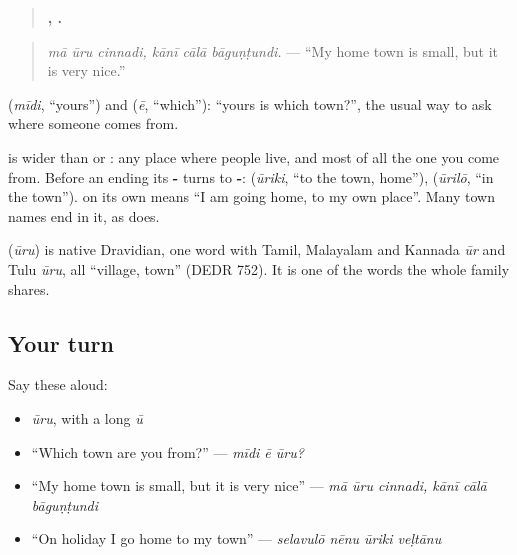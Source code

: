 \begin{quote}
\textbf{  ,   .}
\end{quote}

\begin{quote}
\emph{mā ūru cinnadi, kānī cālā bāguṇṭundi.} — \textquotedblleft{}My home town is small, but it is very nice.\textquotedblright{}
\end{quote}

\textbf{} (\emph{mīdi}, \textquotedblleft{}yours\textquotedblright{}) and \textbf{} (\emph{ē}, \textquotedblleft{}which\textquotedblright{}): \textquotedblleft{}yours is which town?\textquotedblright{}, the usual way to ask where someone comes from.

\textbf{} is wider than \textbf{} or \textbf{}: any place where people live, and most of all the one you come from. Before an ending its \textbf{-} turns to \textbf{-}: \textbf{} (\emph{ūriki}, \textquotedblleft{}to the town, home\textquotedblright{}), \textbf{} (\emph{ūrilō}, \textquotedblleft{}in the town\textquotedblright{}). \textbf{ } on its own means \textquotedblleft{}I am going home, to my own place\textquotedblright{}. Many town names end in it, as \textbf{} does.

\begin{cousinweb}
\textbf{} (\emph{ūru}) is native Dravidian, one word with Tamil, Malayalam and Kannada \emph{ūr} and Tulu \emph{ūru}, all \textquotedblleft{}village, town\textquotedblright{} (DEDR 752). It is one of the words the whole family shares.
\end{cousinweb}

\subsection*{Your turn}
Say these aloud:

\begin{itemize}
\raggedright
  \item \emph{ūru}, with a long \emph{ū}
  \item \textquotedblleft{}Which town are you from?\textquotedblright{} — \emph{mīdi ē ūru?}
  \item \textquotedblleft{}My home town is small, but it is very nice\textquotedblright{} — \emph{mā ūru cinnadi, kānī cālā bāguṇṭundi}
  \item \textquotedblleft{}On holiday I go home to my town\textquotedblright{} — \emph{selavulō nēnu ūriki veḷtānu}
\end{itemize}

